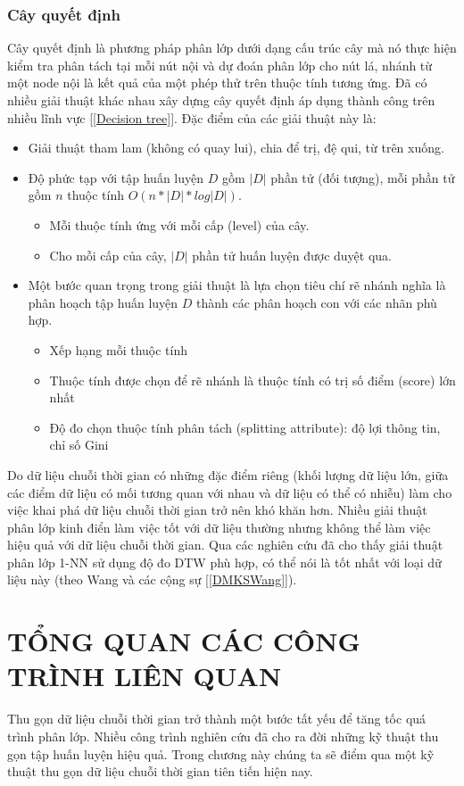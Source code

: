 \documentclass[13pt,oneside]{scrbook}
\begin{document}
\subsection{Cây quyết định}
Cây quyết định là phương pháp phân lớp dưới dạng cấu trúc cây mà nó thực hiện kiểm tra phân tách tại mỗi nút nội và dự đoán phân lớp cho nút lá, nhánh từ một node nội là kết quả của một phép thử trên thuộc tính tương ứng. 
Đã có nhiều giải thuật khác nhau xây dựng cây quyết định áp dụng thành công trên nhiều lĩnh vực
[\ref{Decision tree}].
 Đặc điểm của các giải thuật này là:
\begin{itemize}
	\item Giải thuật tham lam (không có quay lui), chia để trị, đệ qui, từ trên xuống.
	\item Độ phức tạp với tập huấn luyện $D$ gồm $|D|$ phần	tử (đối tượng), mỗi phần tử gồm $n$ thuộc tính $O(n*|D|*log|D|)$.
	\begin{itemize}
		\item Mỗi thuộc tính ứng với mỗi cấp (level) của cây. 
		\item Cho mỗi cấp của cây, $|D|$ phần tử huấn luyện được
		duyệt qua.
	\end{itemize}
	\item Một bước quan trọng trong giải thuật là lựa chọn tiêu chí rẽ nhánh nghĩa là phân hoạch tập huấn luyện $D$ thành các phân hoạch con với các nhãn	phù hợp.
	\begin{itemize}
		\item Xếp hạng mỗi thuộc tính
		\item Thuộc tính được chọn để rẽ nhánh là thuộc tính có trị
		số điểm (score) lớn nhất
		\item Độ đo chọn thuộc tính phân tách (splitting attribute):
		độ lợi thông tin, chỉ số Gini
	\end{itemize}
\end{itemize}

Do dữ liệu chuỗi thời gian có những đặc điểm riêng (khối lượng dữ liệu lớn, giữa các điểm dữ liệu có mối tương quan với nhau và dữ liệu có thể có nhiễu) làm cho việc khai phá dữ liệu chuỗi thời gian trở nên khó khăn hơn.
Nhiều giải thuật phân lớp kinh điển làm việc tốt với dữ liệu thường nhưng không thể làm việc hiệu quả với dữ liệu chuỗi thời gian.
Qua các nghiên cứu đã cho thấy giải thuật phân lớp 1-NN sử dụng độ đo DTW phù hợp, có thể nói là tốt nhất với loại dữ liệu này (theo Wang và các cộng sự [\ref{DMKSWang}]).
\chapter{TỔNG QUAN CÁC CÔNG TRÌNH LIÊN QUAN}\label{Sec:Phan3}
Thu gọn dữ liệu chuỗi thời gian trở thành một bước tất yếu để tăng tốc quá trình phân lớp.
Nhiều công trình nghiên cứu đã cho ra đời những kỹ thuật thu gọn tập huấn luyện hiệu quả. 
Trong chương này chúng ta sẽ điểm qua một kỹ thuật thu gọn dữ liệu chuỗi thời gian tiên tiến hiện nay.
\end{document}
